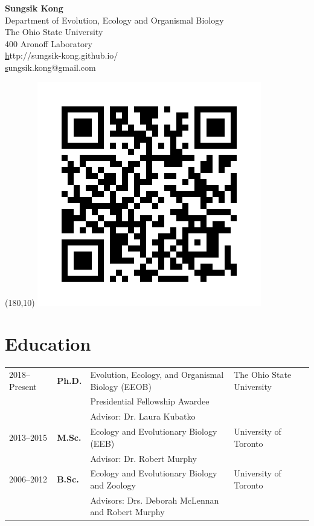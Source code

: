 \documentclass[11pt]{article}
\begin{document}
\pagestyle{plain}

\begin{center}
\huge \textbf{Sungsik Kong}\\
\vspace{0.2cm}
\large Department of Evolution, Ecology and Organismal Biology\\
\large The Ohio State University\\
\large 400 Aronoff Laboratory\\
\small \href{http://sungsik-kong.github.io}http://sungsik-kong.github.io/\\
\small \href{mailto:sungsik.kong@gmail.com}sungsik.kong@gmail.com
\end{center}

\begin{textblock}{20}(180,10)
	\includegraphics[scale=0.2]{miglabaaa.png}
\end{textblock}


\hspace{0pt}




\section*{Education}

\begin{longtable}{p{}  p{} p{} p{}}
2018--Present & \textbf{Ph.D.} & Evolution, Ecology, and Organismal Biology (EEOB) & The Ohio State University\\
 & & Presidential Fellowship Awardee\\
 & & Advisor: Dr. Laura Kubatko\\
2013--2015 & \textbf{M.Sc.} & Ecology and Evolutionary Biology (EEB) & University of Toronto\\
 & & Advisor: Dr. Robert Murphy\\
2006--2012 & \textbf{B.Sc.} & Ecology and Evolutionary Biology and Zoology & University of Toronto\\
 & & Advisors: Drs. Deborah McLennan and Robert Murphy
\end{longtable}
\end{document}
